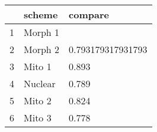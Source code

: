 \begin{table}[ht]
\centering
\begin{tabular}{rll}
  \hline
 & scheme & compare \\ 
  \hline
1 & Morph 1 &  \\ 
  2 & Morph 2 & 0.793179317931793 \\ 
  3 & Mito 1 & 0.893 \\ 
  4 & Nuclear & 0.789 \\ 
  5 & Mito 2 & 0.824 \\ 
  6 & Mito 3 & 0.778 \\ 
   \hline
\end{tabular}
\end{table}
